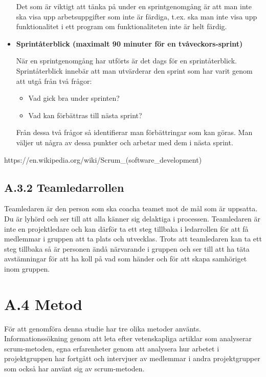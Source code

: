 \begin{itemize}
Det som är viktigt att tänka på under en sprintgenomgång är att man inte ska visa upp arbetsuppgifter som inte är färdiga, t.ex. ska man inte visa upp funktionalitet i ett program om funktionaliteten inte är helt färdig.

\item \textbf{Sprintåterblick (maximalt 90 minuter för en tvåveckors-sprint)}

När en sprintgenomgång har utförts är det dags för en sprintåterblick. Sprintåterblick innebär att man utvärderar den sprint som har varit genom att utgå från två frågor:

\begin{itemize}
	\item Vad gick bra under sprinten?
	\item Vad kan förbättras till nästa sprint?
\end{itemize}

Från dessa två frågor så identifierar man förbättringar som kan göras. Man väljer ut några av dessa punkter och arbetar med dem i nästa sprint.

\end{itemize}
https://en.wikipedia.org/wiki/Scrum\_(software\_development)

\subsection{A.3.2 Teamledarrollen}
Teamledaren är den person som ska coacha teamet mot de mål som är uppsatta. Du är lyhörd och ser till att alla känner sig delaktiga i processen. Teamledaren är inte en projektledare och kan därför ta ett steg tillbaka i ledarrollen för att få medlemmar i gruppen att ta plats och utvecklas.\cite{teamledare} Trots att teamledaren kan ta ett steg tillbaka så är personen ändå närvarande i gruppen och ser till att ha täta avstämningar för att ha koll på vad som händer och för att skapa samhöriget inom gruppen.\cite{teamguide}

\section{A.4 Metod}
För att genomföra denna studie har tre olika metoder använts. Informationssökning genom att leta efter vetenskapliga artiklar som analyserar scrum-metoden, egna erfarenheter genom att analysera hur arbetet i projektgruppen har fortgått och intervjuer av medlemmar i andra projektgrupper som också har använt sig av scrum-metoden.

